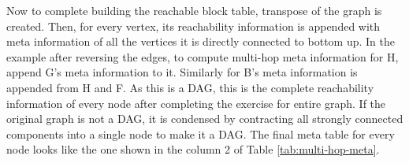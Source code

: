 


Now to complete building the reachable block table, transpose of the graph is created. Then, for every vertex, its reachability information is appended with meta information of all the vertices it is directly connected to bottom up. In the example after reversing the edges, to compute multi-hop meta information for H, append G's meta information to it. Similarly for B's meta information is appended from H and F. As this is a DAG, this is the complete reachability information of every node after completing the exercise for entire graph. If the original graph is not a DAG, it is condensed by contracting all strongly connected components into a single node to make it a DAG. The final meta table for every node looks like the one shown in the column 2 of Table \ref{tab:multi-hop-meta}.

